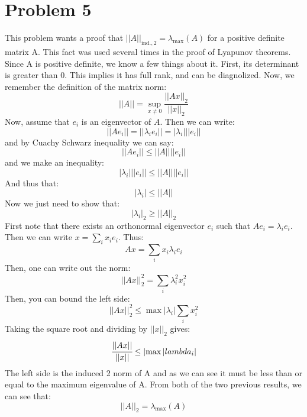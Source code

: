 \documentclass{article}
\begin{document}
\section*{Problem 5}
This problem wants a proof that $\lvert\lvert A\rvert\rvert_{\text{ind.},2}=\lambda_{\text{max}}(A)$ for a positive definite matrix A. This fact was used several times in the proof of Lyapunov theorems.\\
Since A is positive definite, we know a few things about it. First, its determinant is greater than 0. This implies it has full rank, and can be diagnolized. Now, we remember the definition of the matrix norm:
\[\lvert\lvert A\rvert\rvert=\sup_{x\neq 0}\frac{\lvert\lvert Ax\rvert\rvert_2}{\lvert\lvert x\rvert\rvert_2}\]
Now, assume that $e_i$ is an eigenvector of $A$. Then we can write:
\[\lvert\lvert Ae_i\rvert\rvert=\lvert\lvert \lambda_ie_i\rvert\rvert=\lvert\lambda_i\rvert\lvert\lvert e_i\rvert\rvert\]
and by Cuachy Schwarz inequality we can say:
\[\lvert\lvert Ae_i\rvert\rvert\leq \lvert\lvert A\rvert\rvert\lvert\lvert e_i\rvert\rvert\]
and we make an inequality:
\[\lvert \lambda_i\rvert\lvert\lvert e_i\rvert\rvert\leq \lvert\lvert A\rvert\rvert\lvert\lvert e_i\rvert\rvert\]
And thus that:
\[\lvert \lambda_i\rvert\leq \lvert\lvert A\rvert\rvert\]
Now we just need to show that:
\[\lvert \lambda_i\rvert_2\geq \lvert\lvert A\rvert\rvert_2\]
First note that there exists an orthonormal eigenvector $e_i$ such that $Ae_i=\lambda_ie_i$. Then we can write $x=\sum_i x_ie_i$. Thus:
\[Ax=\sum_ix_i\lambda_ie_i\]
Then, one can write out the norm:
\[\lvert\lvert Ax\rvert\rvert_2^2=\sum_i\lambda_i^2x_i^2\]
Then, you can bound the left side:
\[\lvert\lvert Ax\rvert\rvert_2^2\leq \max{\lvert\lambda_i\rvert}\sum_ix_i^2\]
Taking the square root and dividing by $\lvert\lvert x\rvert\rvert_2$ gives:
\[\cfrac{\lvert\lvert Ax\rvert\rvert}{\lvert\lvert x\rvert\rvert}\leq \lvert \max{\lvert lambda_i\rvert}\]
The left side is the induced 2 norm of A and as we can see it must be less than or equal to the maximum eigenvalue of A. From both of the two previous results, we can see that:
\[\lvert\lvert A\rvert\rvert_2=\lambda_{\text{max}}(A)\]
\end{document}
